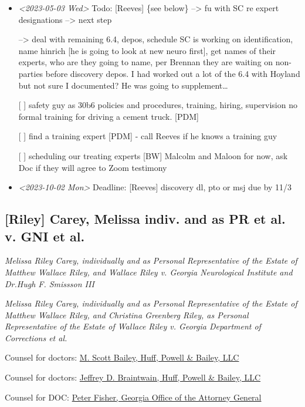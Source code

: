 \documentclass[11pt]{article}
\begin{document}
\begin{itemize}
\item \textit{<2023-05-03 Wed> } Todo: [Reeves] \{see below\} --> fu with SC re expert designations --> next step

--> deal with remaining 6.4, depos, schedule SC is working on identification, name hinrich [he is going to look at new neuro first], get names of their experts, who are they going to name, per Brennan they are waiting on non-parties before discovery depos. I had worked out a lot of the 6.4 with Hoyland but not sure I documented? He was going to supplement\ldots{}

[ ] safety guy as 30b6 policies and procedures, training, hiring, supervision
no formal training for driving a cement truck. [PDM]

[ ] find a training expert [PDM] - call Reeves if he knows a training guy

[ ] scheduling our treating experts [BW] Malcolm and Maloon for now, ask Doc if they will agree to Zoom testimony

\item \textit{<2023-10-02 Mon> } Deadline: [Reeves] discovery dl, pto or msj due by 11/3
\end{itemize}

\subsection*{[Riley] Carey, Melissa indiv. and as PR et al. v. GNI et al.}
\label{sec:orgf5423dc}

\emph{Melissa Riley Carey, individually and as Personal Representative of the Estate of Matthew Wallace Riley, and Wallace Riley v. Georgia Neurological Institute and Dr.Hugh F. Smissson III}

\emph{Melissa Riley Carey, individually and as Personal Representative of the Estate of Matthew Wallace Riley, and Christina Greenberg Riley, as Personal Representative of the Estate of Wallace Riley v. Georgia Department of Corrections et al.}

Counsel for doctors: \href{https://gabar.reliaguide.com/lawyer/30309-GA-Michael-Bailey-248155}{M. Scott Bailey, Huff, Powell \& Bailey, LLC}

Counsel for doctors: \href{https://gabar.reliaguide.com/lawyer/30309-GA-Jeffrey-Braintwain-265975}{Jeffrey D. Braintwain, Huff, Powell \& Bailey, LLC}

Counsel for DOC: \href{https://gabar.reliaguide.com/lawyer/30334-GA-Peter-Fisher-276932}{Peter Fisher, Georgia Office of the Attorney General}
\end{document}
